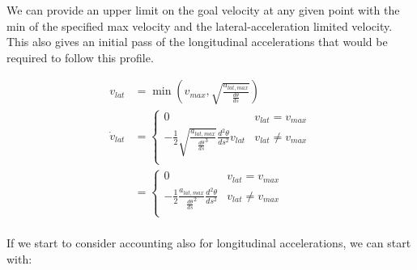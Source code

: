 \documentclass{article}
\begin{document}
We can provide an upper limit on the goal velocity at any given point with the
min of the specified max velocity and the lateral-acceleration limited velocity.
This also gives an initial pass of the longitudinal accelerations that would be
required to follow this profile.

\begin{align*}
v_{lat} &= \min (v_{max}, \sqrt{\frac{a_{lat,max}}{\frac{d\theta}{ds}}}) \\
\dot{v}_{lat} &= \begin{cases} 0 & v_{lat} = v_{max} \\
-\frac12 \sqrt{\frac{a_{lat,max}}{\frac{d\theta}{ds}^3}} \frac{d^2\theta}{ds^2}
v_{lat} & v_{lat} \ne v_{max} \\
\end{cases} \\
&= \begin{cases} 0 & v_{lat} = v_{max} \\
-\frac12 \frac{a_{lat,max}}{\frac{d\theta}{ds}^2} \frac{d^2\theta}{ds^2}
 & v_{lat} \ne v_{max} \\
\end{cases} \\
\end{align*}

If we start to consider accounting also for longitudinal accelerations, we can
start with:
\end{document}
